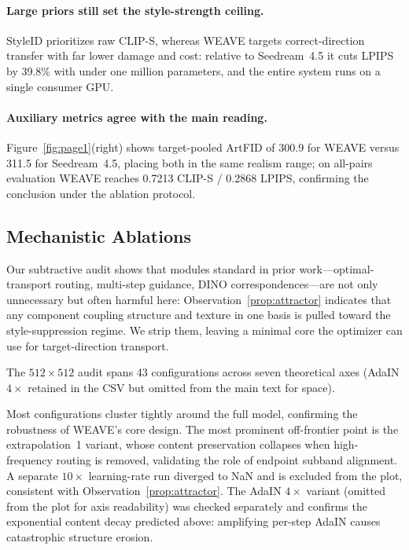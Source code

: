 \documentclass[letterpaper]{article}
\begin{document}
\paragraph{Large priors still set the style-strength ceiling.}
StyleID prioritizes raw CLIP-S, whereas WEAVE targets correct-direction transfer with far lower damage and cost: relative to Seedream~4.5 it cuts LPIPS by 39.8\% with under one million parameters, and the entire system runs on a single consumer GPU.

\paragraph{Auxiliary metrics agree with the main reading.}
Figure~\ref{fig:page1}(right) shows target-pooled ArtFID of 300.9 for WEAVE versus 311.5 for Seedream~4.5, placing both in the same realism range; on all-pairs evaluation WEAVE reaches 0.7213 CLIP-S / 0.2868 LPIPS, confirming the conclusion under the ablation protocol.

\subsection{Mechanistic Ablations}
\label{sec:ablation}

Our subtractive audit shows that modules standard in prior work---optimal-transport routing, multi-step guidance, DINO correspondences---are not only unnecessary but often harmful here: Observation~\ref{prop:attractor} indicates that any component coupling structure and texture in one basis is pulled toward the style-suppression regime.
We strip them, leaving a minimal core the optimizer can use for target-direction transport.

The $512{\times}512$ audit spans 43 configurations across seven theoretical axes (AdaIN $4\times$ retained in the CSV but omitted from the main text for space).

Most configurations cluster tightly around the full model, confirming the robustness of WEAVE's core design.
The most prominent off-frontier point is the extrapolation~1 variant, whose content preservation collapses when high-frequency routing is removed, validating the role of endpoint subband alignment.
A separate $10{\times}$ learning-rate run diverged to NaN and is excluded from the plot, consistent with Observation~\ref{prop:attractor}.
The AdaIN $4{\times}$ variant (omitted from the plot for axis readability) was checked separately and confirms the exponential content decay predicted above: amplifying per-step AdaIN causes catastrophic structure erosion.
\end{document}
